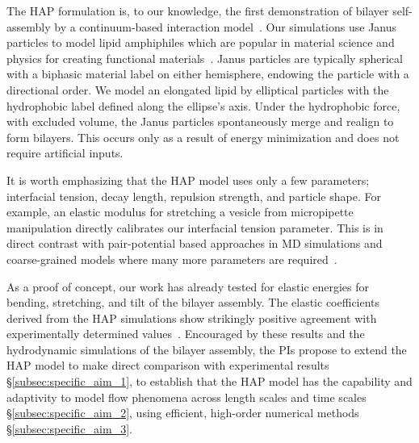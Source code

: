 The HAP formulation is, to our knowledge, the first demonstration of
bilayer self-assembly by a continuum-based interaction
model~\cite{Noguchi2001, Farago2003, Brannigan2006, Brooks2009,
Wang2013}. Our simulations use Janus particles to model lipid
amphiphiles which are popular in material science and physics for
creating functional materials~\cite{Lee2014, Lee2013}. Janus particles
are typically spherical with a biphasic material label on either
hemisphere, endowing the particle with a directional order. We model an
elongated lipid by elliptical particles with the hydrophobic label
defined along the ellipse's axis. Under the hydrophobic force, with
excluded volume, the Janus particles spontaneously merge and realign
to form bilayers. This occurs only as a result of energy minimization
and does not require artificial inputs.

It is worth emphasizing that the HAP model uses only a few parameters;
interfacial tension, decay length, repulsion strength, and particle
shape. For example, an elastic modulus for stretching a vesicle from
micropipette manipulation directly calibrates our interfacial tension
parameter. This is in direct contrast with pair-potential based
approaches in MD simulations and coarse-grained models where many more
parameters are required~\cite{Varilly2011, Wang2013}.

As a proof of concept, our work has already tested for elastic energies
for bending, stretching, and tilt of the bilayer assembly.  The elastic
coefficients derived from the HAP simulations show strikingly positive
agreement with experimentally determined values~\cite{Fu2018_SIAM}.
Encouraged by these results and the hydrodynamic simulations of the
bilayer assembly, the PIs propose to extend the HAP model to make direct
comparison with experimental results  \S\ref{subsec:specific_aim_1}, to
establish that the HAP model has the capability and adaptivity to model
flow phenomena across length scales and time scales
\S\ref{subsec:specific_aim_2}, using efficient, high-order numerical
methods \S\ref{subsec:specific_aim_3}.

